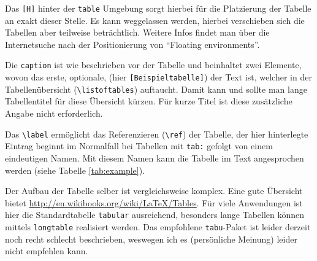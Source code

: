 Das \verb+[H]+ hinter der \verb+table+ Umgebung sorgt hierbei für die Platzierung der Tabelle an exakt dieser Stelle. Es kann weggelassen werden, hierbei verschieben sich die Tabellen aber teilweise beträchtlich. Weitere Infos findet man über die Internetsuche nach der Positionierung von "`Floating environments"'.

Die \verb+caption+ ist wie beschrieben vor der Tabelle und beinhaltet zwei Elemente, wovon das erste, optionale, (hier \verb+[Beispieltabelle]+) der Text ist, welcher in der Tabellenübersicht (\verb+\listoftables+) auftaucht. Damit kann und sollte man lange Tabellentitel für diese Übersicht kürzen. Für kurze Titel ist diese zusätzliche Angabe nicht erforderlich.

Das \verb+\label+ ermöglicht das Referenzieren (\verb+\ref+) der Tabelle, der hier hinterlegte Eintrag beginnt im Normalfall bei Tabellen mit \verb+tab:+ gefolgt von einem eindeutigen Namen. Mit diesem Namen kann die Tabelle im Text angesprochen werden (siehe Tabelle \ref{tab:example}).

Der Aufbau der Tabelle selber ist vergleichsweise komplex. Eine gute Übersicht bietet \url{http://en.wikibooks.org/wiki/LaTeX/Tables}. Für viele Anwendungen ist hier die Standardtabelle \verb+tabular+ ausreichend, besonders lange Tabellen können mittels \verb+longtable+ realisiert werden. Das empfohlene \verb+tabu+-Paket ist leider derzeit noch recht schlecht beschrieben, weswegen ich es (persönliche Meinung) leider nicht empfehlen kann.
